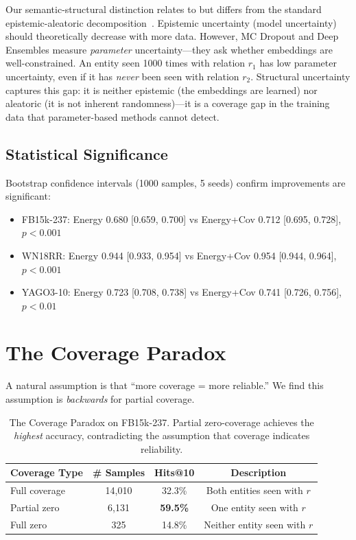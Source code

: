 \documentclass{article}
\begin{document}
Our semantic-structural distinction relates to but differs from the standard epistemic-aleatoric decomposition~\citep{kendall2017uncertainties,hullermeier2021aleatoric}. Epistemic uncertainty (model uncertainty) should theoretically decrease with more data. However, MC Dropout and Deep Ensembles measure \emph{parameter} uncertainty---they ask whether embeddings are well-constrained. An entity seen 1000 times with relation $r_1$ has low parameter uncertainty, even if it has \emph{never} been seen with relation $r_2$. Structural uncertainty captures this gap: it is neither epistemic (the embeddings are learned) nor aleatoric (it is not inherent randomness)---it is a coverage gap in the training data that parameter-based methods cannot detect.

\subsection{Statistical Significance}

Bootstrap confidence intervals (1000 samples, 5 seeds) confirm improvements are significant:
\begin{itemize}
    \item FB15k-237: Energy 0.680 [0.659, 0.700] vs Energy+Cov 0.712 [0.695, 0.728], $p<0.001$
    \item WN18RR: Energy 0.944 [0.933, 0.954] vs Energy+Cov 0.954 [0.944, 0.964], $p<0.001$
    \item YAGO3-10: Energy 0.723 [0.708, 0.738] vs Energy+Cov 0.741 [0.726, 0.756], $p<0.01$
\end{itemize}

\section{The Coverage Paradox}
\label{sec:paradox}

A natural assumption is that ``more coverage = more reliable.'' We find this assumption is \emph{backwards} for partial coverage.

\begin{table}[htbp]
\centering
\caption{The Coverage Paradox on FB15k-237. Partial zero-coverage achieves the \emph{highest} accuracy, contradicting the assumption that coverage indicates reliability.}
\label{tab:paradox}
\begin{tabular}{lccc}
\toprule
Coverage Type & \# Samples & Hits@10 & Description \\
\midrule
Full coverage & 14,010 & 32.3\% & Both entities seen with $r$ \\
Partial zero & 6,131 & \textbf{59.5\%} & One entity seen with $r$ \\
Full zero & 325 & 14.8\% & Neither entity seen with $r$ \\
\bottomrule
\end{tabular}
\end{table}
\end{document}
